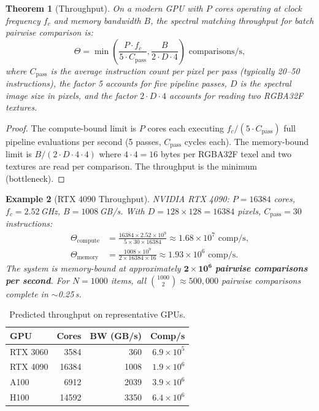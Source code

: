 \documentclass[11pt,twocolumn,a4paper]{article}
\newtheorem{theorem}{Theorem}[section]
\newtheorem{example}[theorem]{Example}
\begin{document}
\begin{theorem}[Throughput]
\label{thm:throughput}
On a modern GPU with $P$ cores operating at clock frequency $f_c$ and
memory bandwidth $B$, the spectral matching throughput for batch
pairwise comparison is:
\begin{equation}
\label{eq:throughput}
  \Theta = \min\left(\frac{P \cdot f_c}{5 \cdot C_{\text{pass}}},
    \frac{B}{2 \cdot D \cdot 4}\right) \text{ comparisons/s},
\end{equation}
where $C_{\text{pass}}$ is the average instruction count per pixel per
pass (typically 20--50 instructions), the factor 5 accounts for five
pipeline passes, $D$ is the spectral image size in pixels, and the
factor $2 \cdot D \cdot 4$ accounts for reading two RGBA32F textures.
\end{theorem}

\begin{proof}
The compute-bound limit is $P$ cores each executing
$f_c / (5 \cdot C_{\text{pass}})$ full pipeline evaluations per second
(5 passes, $C_{\text{pass}}$ cycles each). The memory-bound limit is
$B / (2 \cdot D \cdot 4 \cdot 4)$ where $4 \cdot 4 = 16$ bytes per
RGBA32F texel and two textures are read per comparison. The throughput
is the minimum (bottleneck).
\end{proof}

\begin{example}[RTX 4090 Throughput]
NVIDIA RTX 4090: $P = 16384$ cores, $f_c = 2.52$\,GHz,
$B = 1008$\,GB/s. With $D = 128 \times 128 = 16384$ pixels,
$C_{\text{pass}} = 30$ instructions:
\begin{align}
  \Theta_{\text{compute}} &= \frac{16384 \times 2.52 \times 10^9}{5
    \times 30 \times 16384} \approx 1.68 \times 10^7 \text{ comp/s}, \\
  \Theta_{\text{memory}} &= \frac{1008 \times 10^9}{2 \times 16384
    \times 16} \approx 1.93 \times 10^6 \text{ comp/s}.
\end{align}
The system is memory-bound at approximately $\mathbf{2 \times 10^6}$
\textbf{pairwise comparisons per second}. For $N = 1000$ items, all
$\binom{1000}{2} \approx 500{,}000$ pairwise comparisons complete in
$\sim$0.25\,s.
\end{example}

\begin{table}[t]
\centering
\caption{Predicted throughput on representative GPUs.}
\label{tab:throughput}
\begin{tabular}{lrrr}
\toprule
\textbf{GPU} & \textbf{Cores} & \textbf{BW (GB/s)} & \textbf{Comp/s} \\
\midrule
RTX 3060 & 3584 & 360 & $6.9 \times 10^5$ \\
RTX 4090 & 16384 & 1008 & $1.9 \times 10^6$ \\
A100 & 6912 & 2039 & $3.9 \times 10^6$ \\
H100 & 14592 & 3350 & $6.4 \times 10^6$ \\
\bottomrule
\end{tabular}
\end{table}
\end{document}
